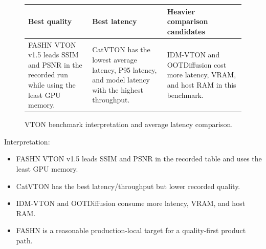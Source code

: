 \documentclass[12pt,a4paper,oneside]{report}
\begin{document}
\begin{figure}[H]
\centering
\small
\begin{tabularx}{\linewidth}{>{\raggedright\arraybackslash}X>{\raggedright\arraybackslash}X>{\raggedright\arraybackslash}X}
\toprule
\textbf{Best quality} & \textbf{Best latency} & \textbf{Heavier comparison candidates} \\
\midrule
FASHN VTON v1.5 leads SSIM and PSNR in the recorded run while using the least GPU memory. &
CatVTON has the lowest average latency, P95 latency, and model latency with the highest throughput. &
IDM-VTON and OOTDiffusion cost more latency, VRAM, and host RAM in this benchmark. \\
\bottomrule
\end{tabularx}

\vspace{0.6em}
\scriptsize
{}
\caption{VTON benchmark interpretation and average latency comparison.}
\end{figure}

Interpretation:

\begin{itemize}
  \item FASHN VTON v1.5 leads SSIM and PSNR in the recorded table and uses the least GPU memory.
  \item CatVTON has the best latency/throughput but lower recorded quality.
  \item IDM-VTON and OOTDiffusion consume more latency, VRAM, and host RAM.
  \item FASHN is a reasonable production-local target for a quality-first product path.
\end{itemize}
\end{document}
